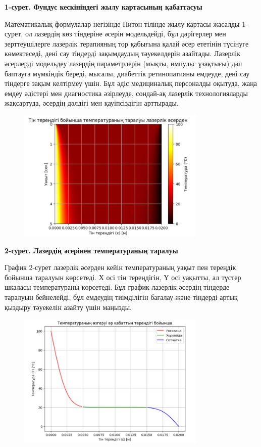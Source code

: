 {\bfseries 1-сурет. Фундус кескініндегі жылу картасының қабаттасуы}

Математикалық формулалар негізінде Питон тілінде жылу картасы жасалды
1-сурет, ол лазердің көз тіндеріне әсерін модельдейді, бұл дәрігерлер
мен зерттеушілерге лазерлік терапияның тор қабығына қалай әсер ететінін
түсінуге көмектеседі, дені сау тіндерді зақымдаудың тәуекелдерін
азайтады. Лазерлік әсерлерді модельдеу лазердің параметрлерін (мықты,
импульс ұзақтығы) дәл баптауға мүмкіндік береді, мысалы, диабеттік
ретинопатияны емдеуде, дені сау тіндерге зақым келтірмеу үшін. Бұл әдіс
медициналық персоналды оқытуда, жаңа емдеу әдістері мен диагностика
әзірлеуде, сондай-ақ лазерлік технологияларды жақсартуда, әсердің
дәлдігі мен қауіпсіздігін арттырады.


\begin{figure}[H]
	\centering
	\includegraphics[width=0.8\textwidth]{media/ict/image21}
	\caption*{}
\end{figure}


{\bfseries 2-сурет. Лазердің әсерінен температураның таралуы}

График 2-сурет лазерлік әсерден кейін температураның уақыт пен тереңдік
бойынша таралуын көрсетеді. Х осі тін тереңдігін, Ү осі уақытты, ал
түстер шкаласы температураны көрсетеді. Бұл график лазерлік әсердің
тіндерде таралуын бейнелейді, бұл емдеудің тиімділігін бағалау және
тіндерді артық қыздыру тәуекелін азайту үшін маңызды.


\begin{figure}[H]
	\centering
	\includegraphics[width=0.8\textwidth]{media/ict/image22}
	\caption*{}
\end{figure}


